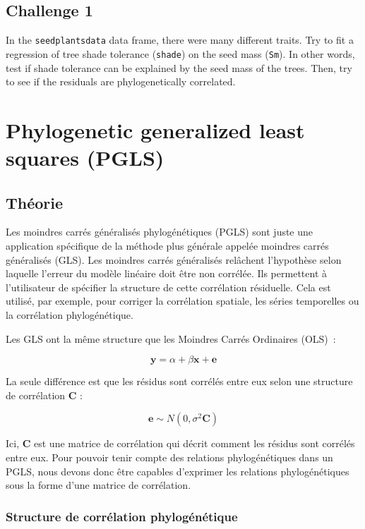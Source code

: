 \documentclass[
]{book}
\begin{document}
\section{Challenge 1}\label{challenge-1}

In the \texttt{seedplantsdata} data frame, there were many different traits. Try to fit a regression of tree shade tolerance (\texttt{shade}) on the seed mass (\texttt{Sm}). In other words, test if shade tolerance can be explained by the seed mass of the trees. Then, try to see if the residuals are phylogenetically correlated.

\chapter{Phylogenetic generalized least squares (PGLS)}\label{pgls}

\section{Théorie}\label{thuxe9orie}

Les moindres carrés généralisés phylogénétiques (PGLS) sont juste une application spécifique de la méthode plus générale appelée moindres carrés généralisés (GLS). Les moindres carrés généralisés relâchent l'hypothèse selon laquelle l'erreur du modèle linéaire doit être non corrélée. Ils permettent à l'utilisateur de spécifier la structure de cette corrélation résiduelle. Cela est utilisé, par exemple, pour corriger la corrélation spatiale, les séries temporelles ou la corrélation phylogénétique.

Les GLS ont la même structure que les Moindres Carrés Ordinaires (OLS)~:

\[\textbf{y} = \alpha + \beta \textbf{x} + \textbf{e}\]

La seule différence est que les résidus sont corrélés entre eux selon une structure de corrélation \(\textbf{C}\) :

\[\textbf{e} \sim N(0,\sigma^2\textbf{C})\]

Ici, \(\textbf{C}\) est une matrice de corrélation qui décrit comment les résidus sont corrélés entre eux. Pour pouvoir tenir compte des relations phylogénétiques dans un PGLS, nous devons donc être capables d'exprimer les relations phylogénétiques sous la forme d'une matrice de corrélation.

\subsection{Structure de corrélation phylogénétique}\label{structure-de-corruxe9lation-phyloguxe9nuxe9tique}
\end{document}
